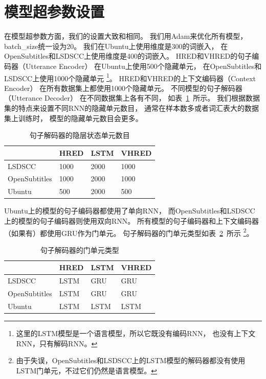 \section{模型超参数设置}\label{sec:model_hparams}
在模型超参数方面，我们的设置大致和\cite{VHRED}相同。
我们用Adam来优化所有模型，
batch\_size统一设为20。
我们在Ubuntu上使用维度是300的词嵌入，
在OpenSubtitles和LSDSCC上使用维度是400的词嵌入。
HRED和VHRED的句子编码器（Utterance Encoder）
在Ubuntu上使用500个隐藏单元，
在OpenSubtitles和LSDSCC上使用1000个隐藏单元
\footnote{这里的LSTM模型是一个语言模型，所以它既没有编码RNN，
也没有上下文RNN，只有解码RNN。}。
HRED和VHRED的上下文编码器（Context Encoder）
在所有数据集上都使用1000个隐藏单元。
不同模型的句子解码器（Utterance Decoder）
在不同数据集上各有不同，
如表~\ref{tab:utterance_decoder_hidden_units}~所示。
我们根据数据集的特点来设置不同RNN的隐藏单元数目，
通常在样本数多或者词汇表大的数据集上训练时，
模型的隐藏单元数目会更多。

\begin{table}[H]
    \centering
    \caption{句子解码器的隐层状态单元数目}
    \label{tab:utterance_decoder_hidden_units}
    \begin{tabular}{llll}
        \toprule
        & HRED & LSTM & VHRED \\
        \midrule
        LSDSCC & 1000 & 2000 & 1000 \\
        OpenSubtitles & 1000 & 2000 & 1000 \\
        Ubuntu & 500 & 2000 & 500 \\
        \bottomrule
    \end{tabular}
\end{table}

Ubuntu上的模型的句子编码器都使用了单向RNN，
而OpenSubtitles和LSDSCC上的模型的句子编码器则使用双向RNN。
所有模型的句子编码器和上下文编码器（如果有）都使用GRU作为门单元。
句子解码器的门单元类型如表~\ref{tab:utterance_decoder_gate_types}~所示
\footnote{由于失误，OpenSubtitles和LSDSCC上的LSTM模型的解码器都没有使用LSTM门单元，不过它们仍然是语言模型。}。
\begin{table}[H]
    \centering
    \caption{句子解码器的门单元类型}
    \label{tab:utterance_decoder_gate_types}
    \begin{tabular}{llll}
        \toprule
        & HRED & LSTM & VHRED \\
        \midrule
        LSDSCC & LSTM & GRU & GRU \\
        OpenSubtitles & LSTM & GRU & GRU \\
        Ubuntu & LSTM & LSTM & LSTM \\
        \bottomrule
    \end{tabular}
\end{table}

